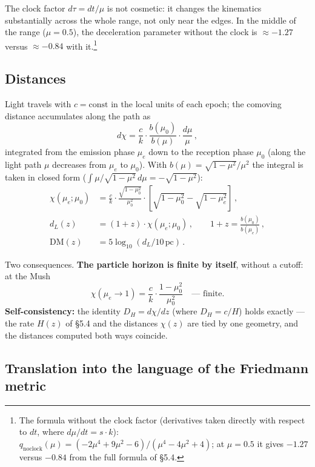 \documentclass{article}
\begin{document}
The clock factor $d\tau = dt/\mu$ is not cosmetic: it changes the kinematics substantially across the whole range, not only near the edges. In the middle of the range ($\mu = 0.5$), the deceleration parameter without the clock is $\approx -1.27$ versus $\approx -0.84$ with it.\footnote{The formula without the clock factor (derivatives taken directly with respect to $dt$, where $d\mu/dt = s\cdot k$): $q_{\text{noclock}}(\mu) = (-2\mu^4 + 9\mu^2 - 6)/(\mu^4 - 4\mu^2 + 4)$; at $\mu = 0.5$ it gives $-1.27$ versus $-0.84$ from the full formula of \S5.4.}

\subsection{Distances}

Light travels with $c = \text{const}$ in the local units of each epoch; the comoving distance accumulates along the path as
\begin{equation}
d\chi = \frac{c}{k} \cdot \frac{b(\mu_0)}{b(\mu)} \cdot \frac{d\mu}{\mu}\,,
\end{equation}
integrated from the emission phase $\mu_e$ down to the reception phase $\mu_0$ (along the light path $\mu$ decreases from $\mu_e$ to $\mu_0$). With $b(\mu) = \sqrt{1 - \mu^2}/\mu^2$ the integral is taken in closed form ($\int \mu/\sqrt{1 - \mu^2}\, d\mu = -\sqrt{1 - \mu^2}$):
\begin{align}
\chi(\mu_e; \mu_0) &= \frac{c}{k} \cdot \frac{\sqrt{1 - \mu_0^2}}{\mu_0^2} \cdot \left[ \sqrt{1 - \mu_0^2} - \sqrt{1 - \mu_e^2} \right]\,, \\
d_L(z) &= (1 + z)\cdot\chi(\mu_e; \mu_0)\,, \qquad 1 + z = \frac{b(\mu_0)}{b(\mu_e)}\,, \\
\text{DM}(z) &= 5\log_{10}(d_L / 10\,\text{pc})\,.
\end{align}

Two consequences. \textbf{The particle horizon is finite by itself}, without a cutoff: at the Mush
\begin{equation}
\chi(\mu_e \to 1) = \frac{c}{k}\cdot\frac{1 - \mu_0^2}{\mu_0^2} \quad \text{--- finite.}
\end{equation}
\textbf{Self-consistency:} the identity $D_H = d\chi/dz$ (where $D_H = c/H$) holds exactly --- the rate $H(z)$ of \S5.4 and the distances $\chi(z)$ are tied by one geometry, and the distances computed both ways coincide.

\subsection{Translation into the language of the Friedmann metric}
\end{document}
